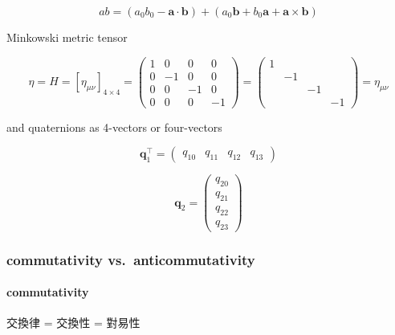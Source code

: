 \documentclass[
]{book}
\theoremstyle{definition}
\theoremstyle{definition}
\theoremstyle{definition}
\theoremstyle{definition}
\theoremstyle{remark}
\begin{document}
\[
ab=\left(a_{{\scriptscriptstyle 0}}b_{{\scriptscriptstyle 0}}-\boldsymbol{a}\cdot\boldsymbol{b}\right)+\left(a_{{\scriptscriptstyle 0}}\boldsymbol{b}+b_{{\scriptscriptstyle 0}}\boldsymbol{a}+\boldsymbol{a}\times\boldsymbol{b}\right)
\]

Minkowski metric tensor

\[
\eta=H=\left[\eta_{{\scriptscriptstyle \mu\nu}}\right]_{4\times4}=\begin{pmatrix}1 & 0 & 0 & 0\\
0 & -1 & 0 & 0\\
0 & 0 & -1 & 0\\
0 & 0 & 0 & -1
\end{pmatrix}=\begin{pmatrix}1\\
 & -1\\
 &  & -1\\
 &  &  & -1
\end{pmatrix}=\eta_{{\scriptscriptstyle \mu\nu}}
\]

and quaternions as 4-vectors or four-vectors

\[
\boldsymbol{q}_{{\scriptscriptstyle 1}}^{\intercal}=\begin{pmatrix}q_{{\scriptscriptstyle 10}} & q_{{\scriptscriptstyle 11}} & q_{{\scriptscriptstyle 12}} & q_{{\scriptscriptstyle 13}}\end{pmatrix}
\]

\[
\boldsymbol{q}_{{\scriptscriptstyle 2}}=\begin{pmatrix}q_{{\scriptscriptstyle 20}}\\
q_{{\scriptscriptstyle 21}}\\
q_{{\scriptscriptstyle 22}}\\
q_{{\scriptscriptstyle 23}}
\end{pmatrix}
\]

\subsubsection{commutativity vs.~anticommutativity}\label{commutativity-vs.-anticommutativity}

\paragraph{commutativity}\label{commutativity}

\begin{CJK}{UTF8}{bsmi}
交換律 = 交換性 = 對易性
\end{CJK}
\end{document}
